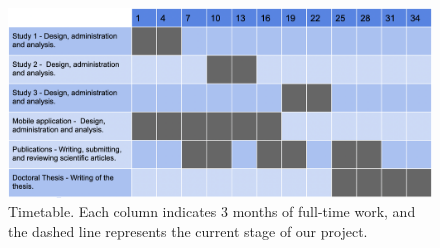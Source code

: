 \documentclass[16pt]{article}
\begin{document}
\begin{figure}[h]
  \centering
  \includegraphics[scale=0.45]{images/timetable.png}
  \caption{Timetable. Each column indicates 3 months of full-time work, and the dashed line represents the current stage of our project.}
\label{fig:fig3}
\end{figure}








\end{document}
